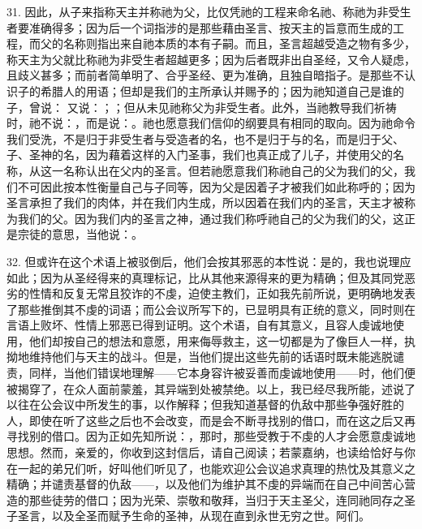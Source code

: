31. 因此，从子来指称天主并称祂为父，比仅凭祂的工程来命名祂、称祂为非受生者要准确得多；因为后一个词指涉的是那些藉由圣言、按天主的旨意而生成的工程，而父的名称则指出来自祂本质的本有子嗣。而且，圣言超越受造之物有多少，称天主为父就比称祂为非受生者超越更多；因为后者既非出自圣经，又令人疑虑，且歧义甚多；而前者简单明了、合乎圣经、更为准确，且独自暗指子。是那些不认识子的希腊人的用语；但却是我们的主所承认并赐予的；因为祂知道自己是谁的子，曾说： 又说：；；但从未见祂称父为非受生者。此外，当祂教导我们祈祷时，祂不说：，而是说：。祂也愿意我们信仰的纲要具有相同的取向。因为祂命令我们受洗，不是归于非受生者与受造者的名，也不是归于与的名，而是归于父、子、圣神的名，因为藉着这样的入门圣事，我们也真正成了儿子，并使用父的名称，从这一名称认出在父内的圣言。但若祂愿意我们称祂自己的父为我们的父，我们不可因此按本性衡量自己与子同等，因为父是因着子才被我们如此称呼的；因为圣言承担了我们的肉体，并在我们内生成，所以因着在我们内的圣言，天主才被称为我们的父。因为我们内的圣言之神，通过我们称呼祂自己的父为我们的父，这正是宗徒的意思，当他说：。\par

32. 但或许在这个术语上被驳倒后，他们会按其邪恶的本性说：是的，我也说理应如此；因为从圣经得来的真理标记，比从其他来源得来的更为精确；但及其同党恶劣的性情和反复无常且狡诈的不虔，迫使主教们，正如我先前所说，更明确地发表了那些推倒其不虔的词语；而公会议所写下的，已显明具有正统的意义，同时则在言语上败坏、性情上邪恶已得到证明。这个术语，自有其意义，且容人虔诚地使用，他们却按自己的想法和意愿，用来侮辱救主，这一切都是为了像巨人一样，执拗地维持他们与天主的战斗。但是，当他们提出这些先前的话语时既未能逃脱谴责，同样，当他们错误地理解——它本身容许被妥善而虔诚地使用——时，他们便被揭穿了，在众人面前蒙羞，其异端到处被禁绝。以上，我已经尽我所能，述说了以往在公会议中所发生的事，以作解释；但我知道基督的仇敌中那些争强好胜的人，即使在听了这些之后也不会改变，而是会不断寻找别的借口，而在这之后又再寻找别的借口。因为正如先知所说：，那时，那些受教于不虔的人才会愿意虔诚地思想。然而，亲爱的，你收到这封信后，请自己阅读；若蒙嘉纳，也读给恰好与你在一起的弟兄们听，好叫他们听见了，也能欢迎公会议追求真理的热忱及其意义之精确；并谴责基督的仇敌——，以及他们为维护其不虔的异端而在自己中间苦心营造的那些徒劳的借口；因为光荣、崇敬和敬拜，当归于天主圣父，连同祂同存之圣子圣言，以及全圣而赋予生命的圣神，从现在直到永世无穷之世。阿们。\par

